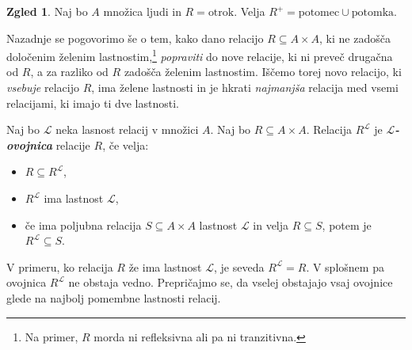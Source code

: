\documentclass[11pt]{book}
\def\definicija{\color{rdeca}\bf\em}
\theoremstyle{definition}
\theoremstyle{zgled}
\newtheorem*{zgled}{Zgled}
\theoremstyle{odprtproblem}
\theoremstyle{domacanaloga}
\theoremstyle{izrek}
\begin{document}
\begin{zgled}
Naj bo $A$ množica ljudi in $R = \text{otrok}$. Velja $R^+ = \text{potomec} \cup \text{potomka}$.
\end{zgled}

Nazadnje se pogovorimo še o tem, kako dano relacijo $R \subseteq A \times A$, ki ne zadošča določenim želenim lastnostim,\footnote{Na primer, $R$ morda ni refleksivna ali pa ni tranzitivna.} \emph{popraviti} do nove relacije, ki ni preveč drugačna od $R$, a za razliko od $R$ zadošča želenim lastnostim. Iščemo torej novo relacijo, ki \emph{vsebuje} relacijo $R$, ima želene lastnosti in je hkrati \emph{najmanjša} relacija med vsemi relacijami, ki imajo ti dve lastnosti.

Naj bo $\mathcal{L}$ neka lasnost relacij v množici $A$. Naj bo $R \subseteq A \times A$. Relacija $R^{\mathcal{L}}$ je {\definicija $\mathcal{L}$-ovojnica} relacije $R$, če velja:
\begin{itemize}
    \item $R \subseteq R^{\mathcal{L}}$,
    \item $R^{\mathcal{L}}$ ima lastnost $\mathcal{L}$,
    \item če ima poljubna relacija $S \subseteq A \times A$ lastnost $\mathcal{L}$ in velja $R \subseteq S$, potem je $R^{\mathcal{L}} \subseteq S$.
\end{itemize}
V primeru, ko relacija $R$ že ima lastnost $\mathcal{L}$, je seveda $R^{\mathcal{L}} = R$. V splošnem pa ovojnica $R^{\mathcal{L}}$ ne obstaja vedno. Prepričajmo se, da vselej obstajajo vsaj ovojnice glede na najbolj pomembne lastnosti relacij.
\end{document}
